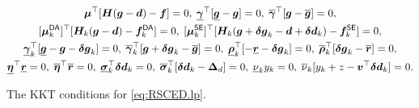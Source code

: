 \begin{figure*}[!t]
{\begin{minipage}{0.98\linewidth}
\begin{itemize}
\begin{subequations}
\begin{gather}
            \v{\mu}^\top [\v{H}(\v{g} - \v{d}) - \v{f}] = 0, \; \underline{\v{\gamma}}^\top [ \underline{\v{g}} - \v{g}] = 0, \;
            \overline{\v{\gamma}}^\top [\v{g} - \overline{\v{g}} ] = 0, \label{eq:rsced.kkt.cs.g} \\
            [\v{\mu}_k^\DA{}]^\top [\v{H}_k (\v{g} - \v{d}) - \v{f}_k^\DA{}] = 0, \;
            [\v{\mu}_k^\SE{}]^\top [\v{H}_k(\v{g} + \v{\delta g}_k - \v{d} + \v{\delta d}_k) - \v{f}_k^\SE{}] = 0, \label{eq:rsced.kkt.cs.flow} \\
            \underline{\v{\gamma}}_k^\top [ \underline{\v{g}} - \v{g} - \v{\delta g}_k] = 0, \;
            \overline{\v{\gamma}}_k^\top [ \v{g} + \v{\delta g}_k - \overline{\v{g}} ] = 0, \;
            \underline{\v{\rho}}_k^\top [ -\underline{\v{r}} - \v{\delta g}_k ] = 0, \;
            \overline{\v{\rho}}_k^\top [\v{\delta g}_k - \overline{\v{r}}] = 0, \label{eq:rsced.kkt.cs.dg} \\
            \underline{\v{\eta}}^\top \underline{\v{r}} = 0, \;
            \overline{\v{\eta}}^\top \overline{\v{r}} = 0, \; 
            \underline{\v{\sigma}}_k^\top \v{\delta d}_k = 0, \;
            \overline{\v{\sigma}}_k^\top [ \v{\delta d}_k - \v{\Delta}_d ] = 0, \; \underline{\nu}_k y_k = 0, \;
            \overline{\nu}_k [ y_k + z - \v{\voll}^\top \v{\delta d}_k ] = 0. \label{eq:rsced.kkt.cs.rdcvar}
        \end{gather}
        \end{subequations}
    \end{itemize}
    \end{minipage}
}
\caption{The KKT conditions for \eqref{eq:RSCED.lp}.}
\label{fig:rsced.kkt}
\end{figure*}